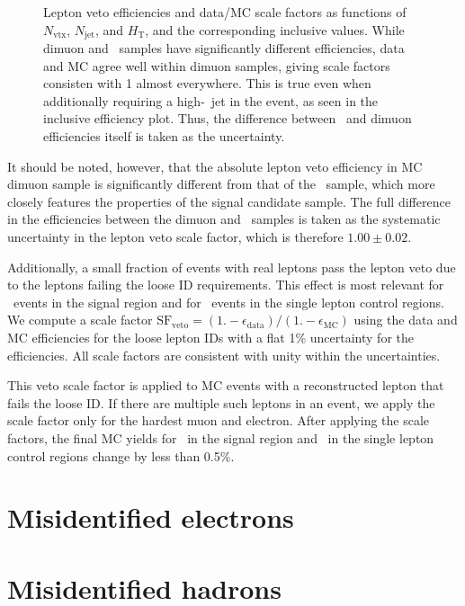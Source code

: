 \begin{figure}[tbph]
  \caption{
    Lepton veto efficiencies and data/MC scale factors as functions of $N_{\text{vtx}}$, $N_{\text{jet}}$, and $H_{\mathrm{T}}$, and the corresponding inclusive values. 
    While dimuon and \zinvg\ samples have significantly different efficiencies, data and MC agree well within dimuon samples, giving scale factors consisten with 1 almost everywhere. 
    This is true even when additionally requiring a high-\pt\ jet in the event, as seen in the inclusive efficiency plot. 
    Thus, the difference between \zinvg\ and dimuon efficiencies itself is taken as the uncertainty.
  }
 \label{fig:leptonveto_efficiencies}
\end{figure}

It should be noted, however, that the absolute lepton veto efficiency in MC dimuon sample is significantly different from that of the \zinvg\ sample, which more closely features the properties of the signal candidate sample. 
The full difference in the efficiencies between the dimuon and \zinvg\ samples is taken as the systematic uncertainty in the lepton veto scale factor, which is therefore $1.00 \pm 0.02$.

Additionally, a small fraction of events with real leptons pass the lepton veto due to the leptons failing the loose ID requirements. 
This effect is most relevant for \wlng\ events in the signal region and for \zllg\ events in the single lepton control regions. 
We compute a scale factor $\text{SF}_{\text{veto}} = (1. - \epsilon_{\text{data}}) / (1. - \epsilon_{\text{MC}})$ using the data and MC efficiencies for the loose lepton IDs with a flat 1\% uncertainty for the efficiencies.
All scale factors are consistent with unity within the uncertainties. 

This veto scale factor is applied to MC events with a reconstructed lepton that fails the loose ID. 
If there are multiple such leptons in an event, we apply the scale factor only for the hardest muon and electron. 
After applying the scale factors, the final MC yields for \wlng\ in the signal  region and \zllg\ in the single lepton control regions change by less than 0.5\%.

\section{Misidentified electrons}
\label{sec:efake}



\section{Misidentified hadrons}
\label{sec:hfake}

